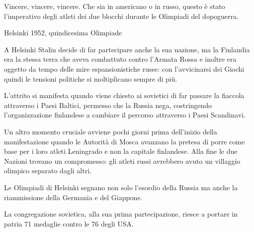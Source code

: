 Vincere, vincere, vincere. Che sia in americano o in russo, questo è stato l’imperativo degli atleti dei due blocchi durante le Olimpiadi del dopoguerra.

Helsinki 1952, quindicesima Olimpiade

A Helsinki Stalin decide di far partecipare anche la sua nazione, ma la Finlandia era la stessa terra che aveva combattuto contro l’Armata Rossa e inoltre era oggetto da tempo delle mire espansionistiche russe: con l’avvicinarsi dei Giochi quindi le tensioni politiche si moltiplicano sempre di più.

L’attrito si manifesta quando viene chiesto ai sovietici di far passare la fiaccola attraverso i Paesi Baltici, permesso che la Russia nega, costringendo l’organizzazione finlandese a cambiare il percorso attraverso i Paesi Scandinavi.

Un altro momento cruciale avviene pochi giorni prima dell’inizio della manifestazione quando le Autorità di Mosca avanzano la pretesa di porre come base per i loro atleti Leningrado e non la capitale finlandese. Alla fine le due Nazioni trovano un compromesso: gli atleti russi avrebbero avuto un villaggio olimpico separato dagli altri.

Le Olimpiadi di Helsinki segnano non solo l’esordio della Russia ma anche la riammissione della Germania e del Giappone.

La congregazione sovietica, alla sua prima partecipazione, riesce a portare in patria 71 medaglie contro le 76 degli USA.
